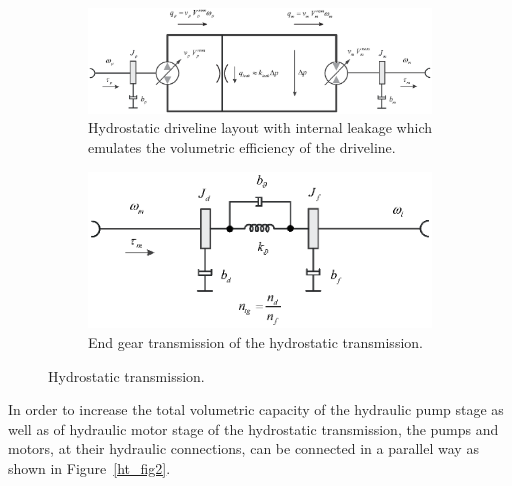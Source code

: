 \documentclass[11pt,a4paper,oneside]{book}
\numberwithin{equation}{section}
\theoremstyle{it}
\theoremstyle{definition}
\begin{document}
\begin{figure}[H]
	\centering
	\begin{subfigure}{1\textwidth}
		\centering
		\includegraphics[width = 450pt, angle = 0, 
		keepaspectratio]{figures/hydrostatic_transmission_1.eps}
		\captionsetup{width=0.5\textwidth}	
		\caption{Hydrostatic driveline layout with 
			internal leakage which emulates the volumetric efficiency of the 
			driveline.}
		\label{ht_fig1a}
	\end{subfigure} 
	\begin{subfigure}{1\textwidth}
		\centering
		\includegraphics[width = 325pt, angle = 0, 
		keepaspectratio]{figures/hydrostatic_transmission_3.eps}
		\captionsetup{width=0.5\textwidth}	
		\caption{End gear transmission of the hydrostatic transmission.}
		\label{ht_fig1b}
	\end{subfigure}
	\caption{Hydrostatic transmission.}
	\label{ht_fig1}
\end{figure}
	In order to increase the total volumetric capacity of the hydraulic pump stage as well as of hydraulic motor stage of the hydrostatic transmission, the pumps and motors, at their hydraulic connections, can be connected in a parallel way as shown in Figure~\ref{ht_fig2}. 
\end{document}
